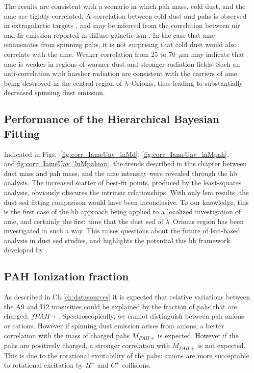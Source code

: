         The results are consistent with a scenario in which \acrshort{pah} mass, cold dust, and the \acrshort{ame} are tightly correlated. A correlation between cold dust and \acrshort{pah}s is observed in extragalactic targets \citep{haas02}, and may be inferred from the correlation between \acrshort{uir} and \acrshort{fir} emission reported in diffuse galactic \acrshort{ism} \citep{onaka96}. In the case that \acrshort{ame} emanenates from spinning \acrshort{pah}s, it is not surprising that cold dust would also correlate with the \acrshort{ame}. Weaker correlation from 25 to 70~$\mu$m may indicate that \acrshort{ame} is weaker in regions of warmer dust and stronger radiation fields. Such an anti-correlation with harsher radiation are consistent with the carriers of \acrshort{ame} being destroyed in the central region of $\lambda$~Orionis, thus leading to substantially decreased spinning dust emission.

      \subsection{Performance of the Hierarchical Bayesian Fitting}


      Indicated in Figs.~\ref{fig:corr_IameUav_lnMd}, \ref{fig:corr_IameUav_lnMpah}, and\ref{fig:corr_IameUav_lnMpahion}, the trends described in this chapter between dust mass and \acrshort{pah} mass, and the \acrshort{ame} intensity were revealed through the \acrshort{hb} analysis. The increased scatter of best-fit points, produced by the least-squares analysis, obviously obscures the intrinsic relationships. With only \acrshort{lsm} results, the dust \acrshort{sed} fitting comparison would have been inconclusive. To our knowledge, this is the first case of the \acrshort{hb} approach being applied to a localized investigation of \acrshort{ame}, and certainly the first time that the dust \acrshort{sed} of $\lambda$~Orionis region has been investigated in such a way. This raises questions about the future of \acrshort{lsm}-based analysis in dust \acrshort{sed} studies, and highlights the potential this \acrshort{hb} framework developed by \cite{galliano18}.


      \subsection{PAH Ionization fraction}
          As described in Ch.\ref{ch:datasources} it is expected that relative variations between the A9 and I12 intensities could be explained by the fraction of \acrshort{pah}s that are charged, $fPAH+$. Spectroscopically, we cannot distinguish between \acrshort{pah} anions or cations. However if spinning dust emission arises from anions, a better correlation with the mass of charged \acrshort{pah}s $M_{PAH+}$ is expected. However if the \acrshort{pah}s are positively charged, a stronger correlation with $M_{PAH+}$ is not expected. This is due to the rotational excitability of the \acrshort{pah}s: anions are more succeptable to rotational excitation by $H^{+}$ and $C^{+}$ collisions\citep{ali-haimoud10}.

